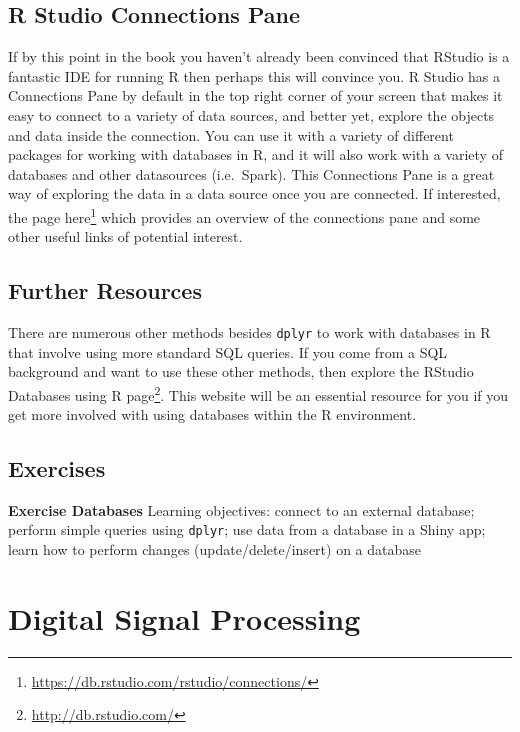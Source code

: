 \documentclass[
]{krantz}
\renewcommand{\href}[2]{#2\footnote{\url{#1}}}
\begin{document}
\hypertarget{r-studio-connections-pane}{%
\section{R Studio Connections Pane}\label{r-studio-connections-pane}}

If by this point in the book you haven't already been convinced that RStudio is a fantastic IDE for running R then perhaps this will convince you. R Studio has a Connections Pane by default in the top right corner of your screen that makes it easy to connect to a variety of data sources, and better yet, explore the objects and data inside the connection. You can use it with a variety of different packages for working with databases in R, and it will also work with a variety of databases and other datasources (i.e.~Spark). This Connections Pane is a great way of exploring the data in a data source once you are connected. If interested, the page \href{https://db.rstudio.com/rstudio/connections/}{here} which provides an overview of the connections pane and some other useful links of potential interest.

\hypertarget{further-resources}{%
\section{Further Resources}\label{further-resources}}

There are numerous other methods besides \texttt{dplyr} to work with databases in R that involve using more standard SQL queries. If you come from a SQL background and want to use these other methods, then explore the \href{http://db.rstudio.com/}{RStudio Databases using R page}. This website will be an essential resource for you if you get more involved with using databases within the R environment.

\hypertarget{exDatabases}{%
\section{Exercises}\label{exDatabases}}

\textbf{Exercise Databases} Learning objectives: connect to an external database; perform simple queries using \texttt{dplyr}; use data from a database in a Shiny app; learn how to perform changes (update/delete/insert) on a database

\hypertarget{digital-signal-processing}{%
\chapter{Digital Signal Processing}\label{digital-signal-processing}}
\end{document}
